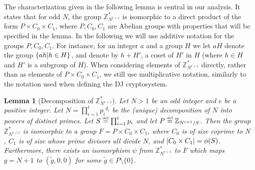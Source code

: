 \documentclass[11pt]{article}
\newtheorem{lemma}[theorem]{Lemma}
\newcommand{\encdj}{{E}_{N,e}}
\newcommand{\Z}{\mathbb{Z}}
\newcommand{\U}[1]{\mathbb{Z}_{#1}^*}
\newcommand{\mathify}[1]{\ifmmode{#1}\else\mbox{$#1$}\fi}
\newcommand{\set}[2][]{\mathify{{\left\{#2\right\}}^{#1}}}
\newcommand{\condset}[2]{\set{#1|#2}}
\newcommand{\size}[1]{\mathify{\left| #1 \right|}}
\newcommand{\order}{{\mathrm{ord}}}
\newcommand{\eqdef}{\stackrel{\mbox{\tiny def}}{{=}}}
\begin{document}
The characterization given in the following lemma is central in our
analysis. It states that for odd $N$, the group $\U{N^{e+1}}$ is
isomorphic to a direct product of the form $P\times C_0\times C_1$,
where $P,C_0,C_1$ are Abelian groups with properties that will be
specified in the lemma. In the following we will use additive
notation for the groups $P,C_0,C_1$. For instance, for an integer $a$
and a group $H$ we let $aH$ denote the group $\condset{ah}{h\in H}$,
and denote by $h+H'$, a coset of $H'$ in $H$ (where $h\in H$ and $H'$
is a subgroup of $H$). When considering elements of $\U{N^{e+1}}$
directly, rather than as elements of $P\times C_0\times C_1$, we
still use multiplicative notation, similarly to the notation used
when defining the DJ cryptosystem.
\begin{lemma}[Decomposition of $\U{N^{e+1}}$]
\label{lem-g-structure} Let $N>1$ be an odd integer and $e$ be a
positive integer.  Let $N=\prod_{i=1}^t{p_i}^{d_i}$ be the (unique)
decomposition of $N$ into powers of distinct primes. Let
$S\eqdef\prod^t_{i=1}p_i$ and let $P\eqdef\Z_{N^{e+1}/S}$. Then the
group $\U{N^{e+1}}$ is isomorphic to a group $F= P\times C_0\times
C_1$, where $C_0$ is of size coprime to $N$, $C_1$ is of size whose
prime divisors all divide $N$, and $\size{C_0\times C_1}=\phi(S)$.
Furthermore, there exists an isomorphism $\psi$ from $\U{N^{e+1}}$ to $F$
which maps $g=N+1$ to $(\tilde{g},0,0)$ for some $\tilde{g}\in
P\setminus\{0\}$.
\end{lemma}

%
\end{document}
